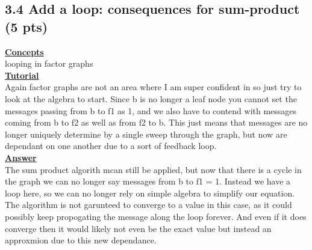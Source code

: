 \documentclass[11pt]{article}
\begin{document}
\subsection{3.4 Add a loop: consequences for sum-product (5 pts)}
\noindent \textbf{\underline{Concepts}}\\
looping in factor graphs\\
\noindent \textbf{\underline{Tutorial}}\\
Again factor graphs are not an area where I am super confident in so just try to look at the algebra to start.  Since b is no longer a leaf
 node you cannot set the messages passing from b to f1 as 1, and we also have to contend with messages coming from b to f2 as well as from
 f2 to b.  This just means that messages are no longer uniquely determine by a single sweep through the graph, but now are dependant on one
 another due to a sort of feedback loop.\\
\noindent \textbf{\underline{Answer}}\\
The sum product algorith mcan still be applied, but now that there is a cycle in the graph we can no longer say messages from b to f1 = 1.
 Instead we have a loop here, so we can no longer rely on simple algebra to simplify our equation.  The algorithm is not garunteed to
 converge to a value in this case, as it could possibly keep propogating the message along the loop forever.  And even if it does converge
 then it would likely not even be the exact value but instead an approxmion due to this new dependance.
\end{document}
